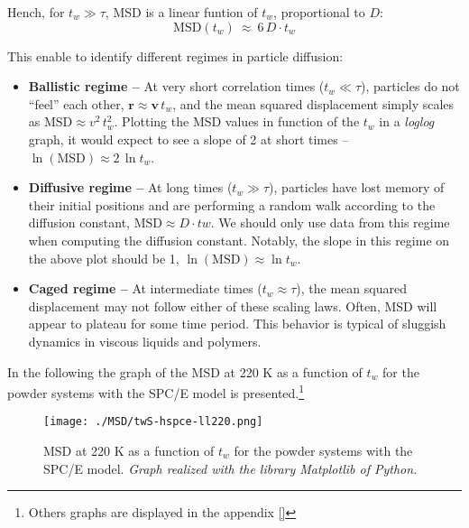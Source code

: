 Hench, for $t_w \gg \tau$, MSD is a linear funtion of $t_w$, proportional to $D$:
\begin{equation}
\text{MSD}(t_w) \: \approx \: 6 \, D \cdot t_w
\end{equation}

This enable to identify different regimes in particle diffusion:
\begin{itemize}
\item \textbf{Ballistic regime --}  At very short correlation times ($t_w \ll \tau$), particles do not ``feel'' each other, $\textbf{r} \approx \textbf{v} \, t_w$, and the mean squared displacement simply scales as $\text{MSD} \approx v^2 \, t_w^2$.  Plotting the MSD values in function of the $t_w$ in a \textit{loglog} graph, it would expect to see a slope of 2 at short times -- $\ln(\text{MSD}) \approx 2\, \ln t_w$. 
\item \textbf{Diffusive  regime --} At long times ($t_w \gg \tau$), particles have lost memory of their initial positions and are performing a random walk according to the diffusion constant, $\text{MSD} \approx D \cdot tw$.  We should only use data from this regime when computing the diffusion constant.  Notably, the slope in this regime on the above plot should be 1, $\ln(\text{MSD}) \approx \ln t_w$.
\item \textbf{Caged regime --} At intermediate times ($t_w \approx \tau$), the mean squared displacement may not follow either of these scaling laws.  Often, MSD will appear to plateau for some time period.  This behavior is typical of sluggish dynamics in viscous liquids and polymers. 
\end{itemize}

In the following the graph of the MSD at 220 K as a function of $t_w$ for the powder systems with the SPC/E model is presented.\footnote{Others graphs are displayed in the appendix \ref{}}
\begin{figure}[H]
\centering
\begin{minipage}[t]{\textwidth}
	\centering
    \texttt{[image: ./MSD/twS-hspce-ll220.png]}
    
    \footnotesize{\caption{MSD at 220 K as a function of $t_w$ for the powder systems with the SPC/E model. \textit{Graph realized with the library Matplotlib of Python.}}
    \label{fig:wrong-hydr}
    }
\end{minipage} 
\end{figure}

